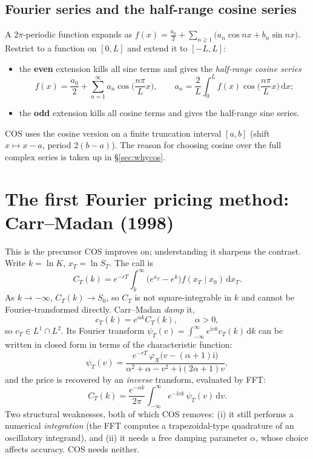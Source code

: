 \documentclass[11pt]{article}
\newcommand{\ii}{\mathrm{i}}
\newcommand{\dd}{\,\mathrm{d}}
\newcommand{\ch}{\varphi}
\begin{document}
\subsection{Fourier series and the half-range cosine series}\label{sec:halfrange}
A $2\pi$-periodic function expands as
$f(x)=\tfrac{a_0}{2}+\sum_{n\ge 1}\big(a_n\cos nx+b_n\sin nx\big)$. Restrict to a function on $[0,L]$ and extend
it to $[-L,L]$:
\begin{itemize}[leftmargin=*]
  \item the \textbf{even} extension kills all sine terms and gives the \emph{half-range cosine series}
  \begin{equation}\label{eq:halfcos}
  f(x)=\frac{a_0}{2}+\sum_{n=1}^{\infty} a_n\cos\!\Big(\frac{n\pi}{L}x\Big),
  \qquad a_n=\frac{2}{L}\int_0^L f(x)\cos\!\Big(\frac{n\pi}{L}x\Big)\dd x ;
  \end{equation}
  \item the \textbf{odd} extension kills all cosine terms and gives the half-range sine series.
\end{itemize}
COS uses the cosine version on a finite truncation interval $[a,b]$ (shift $x\mapsto x-a$, period $2(b-a)$).
The reason for choosing cosine over the full complex series is taken up in \S\ref{sec:whycos}.

\section{The first Fourier pricing method: Carr--Madan (1998)}\label{sec:carrmadan}

This is the precursor COS improves on; understanding it sharpens the contrast. Write $k=\ln K$,
$x_T=\ln S_T$. The call is
\begin{equation}
C_T(k)=e^{-rT}\int_{k}^{\infty}\big(e^{x_T}-e^{k}\big) f(x_T\mid x_0)\dd x_T .
\end{equation}
As $k\to-\infty$, $C_T(k)\to S_0$, so $C_T$ is not square-integrable in $k$ and cannot be Fourier-transformed
directly. Carr--Madan \emph{damp} it,
\begin{equation}
c_T(k)=e^{\alpha k}C_T(k),\qquad \alpha>0,
\end{equation}
so $c_T\in L^1\cap L^2$. Its Fourier transform $\psi_T(v)=\int_{-\infty}^{\infty} e^{\ii v k} c_T(k)\dd k$ can be
written in closed form in terms of the characteristic function:
\begin{equation}\label{eq:carrmadan}
\psi_T(v)=\frac{e^{-rT}\,\ch_X\!\big(v-(\alpha+1)\ii\big)}{\alpha^2+\alpha-v^2+\ii(2\alpha+1)v},
\end{equation}
and the price is recovered by an \emph{inverse} transform, evaluated by FFT:
\begin{equation}
C_T(k)=\frac{e^{-\alpha k}}{2\pi}\int_{-\infty}^{\infty} e^{-\ii v k}\,\psi_T(v)\dd v .
\end{equation}
Two structural weaknesses, both of which COS removes: (i) it still performs a numerical \emph{integration}
(the FFT computes a trapezoidal-type quadrature of an oscillatory integrand), and (ii) it needs a free damping
parameter $\alpha$, whose choice affects accuracy. COS needs neither.
\end{document}
